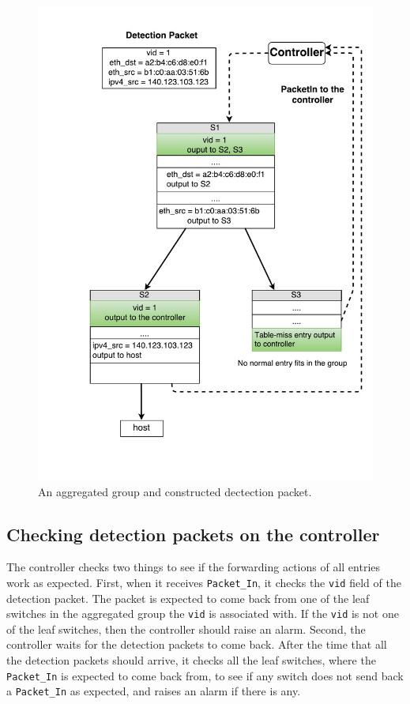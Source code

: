 \begin{figure}[H]
\begin{center}
\includegraphics[width=1\textwidth]{figures/aggregated_group.pdf} %
\end{center}
\caption{An aggregated group and constructed dectection packet. \sout{}}
\label{aggregated_group}
\end{figure}

\subsection{Checking detection packets on the controller}
The controller checks two things to see if the forwarding actions of all entries work as expected. First, when it receives \texttt{Packet\_In}, it checks the \texttt{vid} field of the detection packet. The packet is expected to come back from one of the leaf switches in the aggregated group the \texttt{vid} is associated with. If the \texttt{vid} is not one of the leaf switches, then the controller should raise an alarm. Second, the controller waits for the detection packets to come back. After the time that all the detection packets should arrive, it checks all the leaf switches, where the \texttt{Packet\_In} is expected to come back from, to see if any switch does not send back a \texttt{Packet\_In} as expected, and raises an alarm if there is any. 

